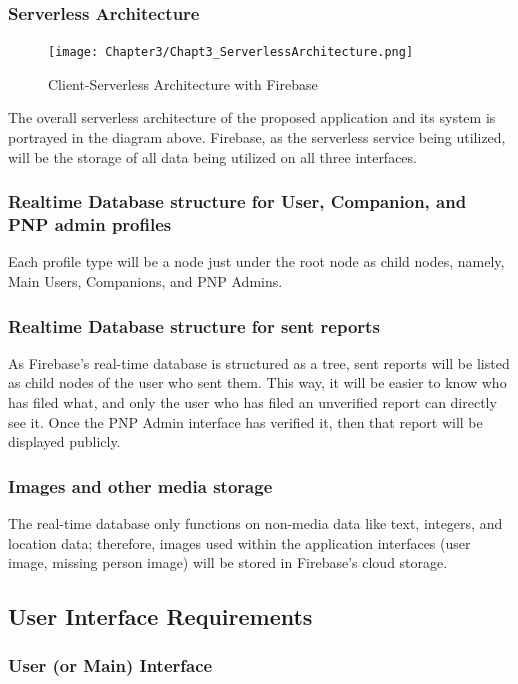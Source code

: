 \subsubsection{Serverless Architecture}

\begin{figure}[!h]
    \centering
    \texttt{[image: Chapter3/Chapt3\_ServerlessArchitecture.png]}
    \caption{Client-Serverless Architecture with Firebase}
    \label{fig:ServerlessFirebase}
\end{figure}

The overall serverless architecture of the proposed application and its system is portrayed in the diagram above. Firebase, as the serverless service being utilized, will be the storage of all data being utilized on all three interfaces. 

\subsubsection{Realtime Database structure for User, Companion, and PNP admin profiles}
Each profile type will be a node just under the root node as child nodes, namely, Main Users, Companions, and PNP Admins. 

\subsubsection{Realtime Database structure for sent reports}
As Firebase’s real-time database is structured as a tree, sent reports will be listed as child nodes of the user who sent them. This way, it will be easier to know who has filed what, and only the user who has filed an unverified report can directly see it. Once the PNP Admin interface has verified it, then that report will be displayed publicly.

\subsubsection{Images and other media storage}
The real-time database only functions on non-media data like text, integers, and location data; therefore, images used within the application interfaces (user image, missing person image) will be stored in Firebase’s cloud storage.

\subsection{User Interface Requirements}
\subsubsection{User (or Main) Interface}

